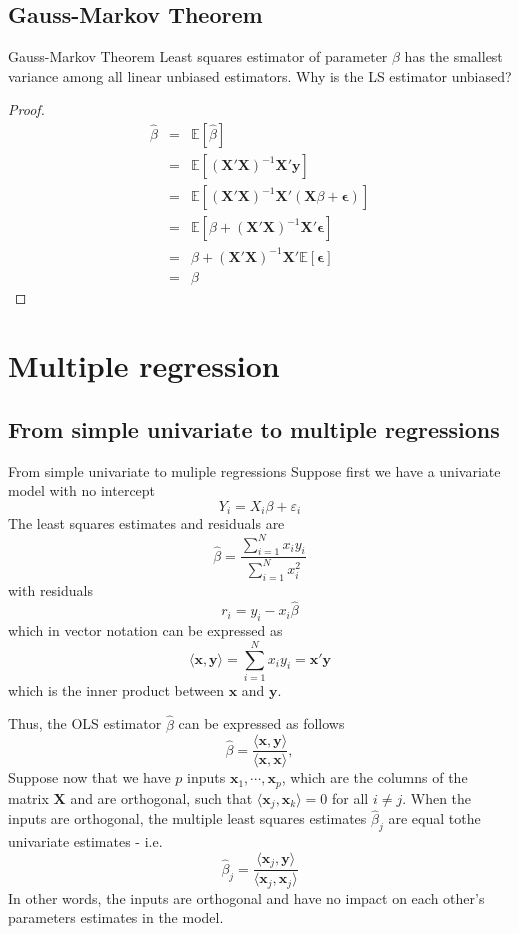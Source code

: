 \documentclass{beamer}
\newcommand{\E}{\mathbb{E}}
\begin{document}
\subsection{Gauss-Markov Theorem}
\begin{frame}{Gauss-Markov Theorem}
Least squares estimator of parameter $\beta$ has the smallest variance among all linear unbiased estimators.
Why is the LS estimator unbiased?
\begin{proof}
\begin{eqnarray*}
\hat{\beta}&=&\E[\hat{\beta}]\\
&=&\E[(\bm{X}'\bm{X})^{-1}\bm{X}'\bm{y}]\\
&=&\E[(\bm{X}'\bm{X})^{-1}\bm{X}'(\bm{X}\beta+\bm{\epsilon})]\\
&=&\E[\beta+(\bm{X}'\bm{X})^{-1}\bm{X}'\bm{\epsilon}]\\
&=&\beta+(\bm{X}'\bm{X})^{-1}\bm{X}'\E[\bm{\epsilon}]\\
&=&\beta
\end{eqnarray*}
\end{proof}
\end{frame}

\section{Multiple regression}
\subsection{From simple univariate to multiple regressions}
\begin{frame}{From simple univariate to muliple regressions}
Suppose first we have a univariate model with no intercept
\[
Y_i=X_i\beta+\varepsilon_i
\]
The least squares estimates and residuals are
\[
\hat{\beta}=\frac{\sum\limits_{i=1}^{N}x_iy_i}{\sum\limits_{i=1}^{N}x_i^2}
\]
with residuals
\[
r_i=y_i-x_i\hat{\beta}
\]
which in vector notation can be expressed as 
\[
\langle\bm{x},\bm{y}\rangle=\sum\limits_{i=1}^{N}x_iy_i=\bm{x}'\bm{y}
\] 
which is the inner product between $\bm{x}$ and $\bm{y}$.
\end{frame}

\begin{frame}
Thus, the OLS estimator $\hat{\beta}$ can be expressed as follows
\[
\hat{\beta}=\frac{\langle\bm{x},\bm{y}\rangle}{\langle\bm{x},\bm{x}\rangle},
\]
Suppose now that we have $p$ inputs $\bm{x}_1,\cdots,\bm{x}_p$, which are the columns of the matrix $\bm{X}$ and are orthogonal, such that $\langle\bm{x}_j,\bm{x}_k\rangle=0$ for all $i\neq j$. When the inputs are orthogonal, the multiple least squares estimates $\hat{\beta}_j$ are equal tothe univariate estimates - i.e. 
\[
\hat{\beta}_j=\frac{\langle\bm{x}_j,\bm{y}\rangle}{\langle\bm{x}_j,\bm{x}_j\rangle}
\] 
In other words, the inputs are orthogonal and have no impact on each other's parameters estimates in the model.
\end{frame}
\end{document}
